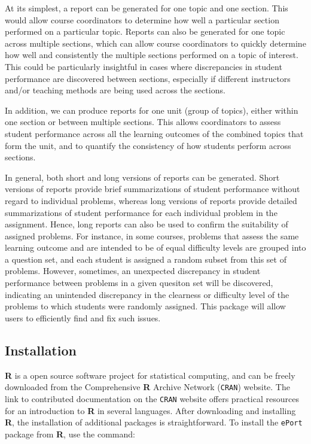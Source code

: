 \documentclass{article}\usepackage[]{graphicx}\usepackage[]{color}
\numberwithin{equation}{section} %
\newcommand{\pkg}[1]{{\texttt{#1}}}
\begin{document}
At its simplest, a report can be generated for one topic and one section. This would allow course coordinators to determine how well a particular section performed on a particular topic. Reports can also be generated for one topic across multiple sections, which can allow course coordinators to quickly determine how well and consistently the multiple sections performed on a topic of interest. This could be particularly insightful in cases where discrepancies in student performance are discovered between sections, especially if different instructors and/or teaching methods are being used across the sections.

In addition, we can produce reports for one unit (group of topics), either within one section or between multiple sections. This allows coordinators to assess student performance across all the learning outcomes of the combined topics that form the unit, and to quantify the consistency of how students perform across sections.

In general, both short and long versions of reports can be generated. Short versions of reports provide brief summarizations of student performance without regard to individual problems, whereas long versions of reports provide detailed summarizations of student performance for each individual problem in the assignment. Hence, long reports can also be used to confirm the suitability of assigned problems. For instance, in some courses, problems that assess the same learning outcome and are intended to be of equal difficulty levels are grouped into a question set, and each student is assigned a random subset from this set of problems. However, sometimes, an unexpected discrepancy in student performance between problems in a given quesiton set will be discovered, indicating an unintended discrepancy in the clearness or difficulty level of the problems to which students were randomly assigned. This package will allow users to efficiently find and fix such issues. 

\subsection{Installation}

\textbf{\textsf{R}} is a open source software project for statistical computing, and can be freely downloaded from the Comprehensive \textbf{\textsf{R}} Archive Network (\texttt{CRAN}) website. The link to contributed documentation on the \texttt{CRAN} website offers practical resources for an introduction to \textbf{\textsf{R}} in several languages. After downloading and installing \textbf{\textsf{R}}, the installation of additional packages is straightforward. To install the \pkg{ePort} package from \textbf{\textsf{R}}, use the command: \\
\end{document}
